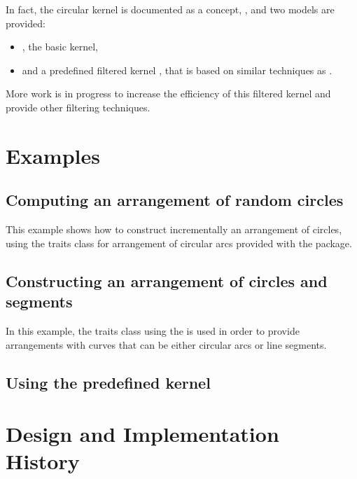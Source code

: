 In fact, the circular kernel is documented as a concept, , 
and two models are provided: 
\begin{itemize}
\item {} , the basic kernel, 
\item {} and
a predefined filtered kernel , 
that is based on similar techniques as 
. 
\end{itemize}
More work is in progress to increase the efficiency of this filtered kernel
and provide other filtering techniques. 

\section{Examples}

	\subsection{Computing an arrangement of random circles} 

This example shows how to construct incrementally an arrangement of
circles, using the traits class for arrangement of circular arcs
provided with the package.


	\subsection{Constructing an arrangement of circles and segments} 

In this example, the traits class using the
is used in order to provide arrangements with curves that can be
either circular arcs or line segments.


	\subsection{Using the predefined kernel} 


\section{Design and Implementation History}
